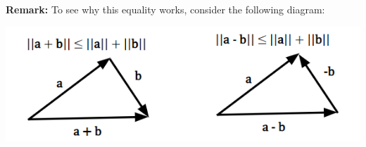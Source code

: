 \documentclass[letterpaper]{article}
\newcommand{\0}{\mathbf{0}}
\renewcommand{\b}{\mathbf{b}}
\newcommand{\x}{\mathbf{x}}
\begin{document}

\textbf{Remark:} To see why this equality works, consider the following diagram:
\begin{center}
    \includegraphics[scale=0.8]{../assets/triangle_min_plu.png}
\end{center}
\end{document}
